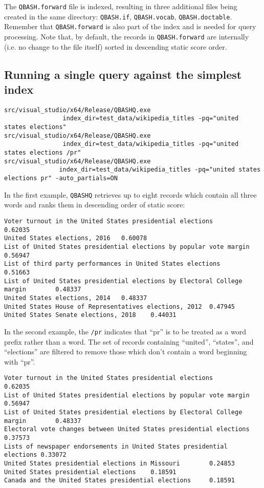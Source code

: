 \documentclass{article}
\begin{document}
\noindent The \texttt{QBASH.forward} file is indexed, resulting in three
additional files being created in the same directory:
\texttt{QBASH.if}, \texttt{QBASH.vocab}, \texttt{QBASH.doctable}.
Remember that \texttt{QBASH.forward} is also part of the index and is
needed for query processing.  Note that, by default, the records in
\texttt{QBASH.forward} are internally (i.e. no change to the file
itself) sorted in descending static score order.

\subsection{Running a single query against the simplest index}
{\footnotesize
\begin{verbatim}
src/visual_studio/x64/Release/QBASHQ.exe
                index_dir=test_data/wikipedia_titles -pq="united states elections"
src/visual_studio/x64/Release/QBASHQ.exe
                index_dir=test_data/wikipedia_titles -pq="united states elections /pr"
src/visual_studio/x64/Release/QBASHQ.exe
               index_dir=test_data/wikipedia_titles -pq="united states elections pr" -auto_partials=ON
\end{verbatim}
}

\noindent In the first example, \texttt{QBASHQ} retrieves up to eight records which
contain all three words and ranks them in descending order of static
score:
{\footnotesize
\begin{verbatim}
Voter turnout in the United States presidential elections       0.62035
United States elections, 2016   0.60078
List of United States presidential elections by popular vote margin     0.56947
List of third party performances in United States elections     0.51663
List of United States presidential elections by Electoral College margin        0.48337
United States elections, 2014   0.48337
United States House of Representatives elections, 2012  0.47945
United States Senate elections, 2018    0.44031

\end{verbatim}
}

\noindent In the second example, the \texttt{/pr} indicates that ``pr'' is to be
treated as a word prefix rather than a word.   The set of records
containing ``united'', ``states'', and  ``elections'' are filtered to remove those which
don't contain a word beginning with ``pr''.  

{\footnotesize
\begin{verbatim}Voter turnout in the United States presidential elections       0.62035
List of United States presidential elections by popular vote margin     0.56947
List of United States presidential elections by Electoral College margin        0.48337
Electoral vote changes between United States presidential elections     0.37573
Lists of newspaper endorsements in United States presidential elections 0.33072
United States presidential elections in Missouri        0.24853
United States presidential elections    0.18591
Canada and the United States presidential elections     0.18591

\end{verbatim}
}
\end{document}
